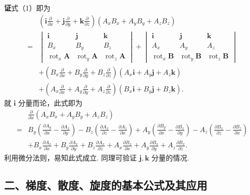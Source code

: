 \documentclass[UTF8, 12pt, fontset=fandol, oneside]{ctexart}
\begin{document}
\noindent\textbf{证}\quad 式（1）即为
\[
\begin{aligned}
&\left(\mathbf i\frac{\partial}{\partial x}+\mathbf j\frac{\partial}{\partial y}+\mathbf k\frac{\partial}{\partial z}\right)
(A_xB_x+A_yB_y+A_zB_z)\\
={}&
\begin{vmatrix}
\mathbf i & \mathbf j & \mathbf k\\
B_x & B_y & B_z\\
\operatorname{rot}_x\mathbf A & \operatorname{rot}_y\mathbf A & \operatorname{rot}_z\mathbf A
\end{vmatrix}
+
\begin{vmatrix}
\mathbf i & \mathbf j & \mathbf k\\
A_x & A_y & A_z\\
\operatorname{rot}_x\mathbf B & \operatorname{rot}_y\mathbf B & \operatorname{rot}_z\mathbf B
\end{vmatrix}\\
&+\left(B_x\frac{\partial}{\partial x}+B_y\frac{\partial}{\partial y}+B_z\frac{\partial}{\partial z}\right)(A_x\mathbf i+A_y\mathbf j+A_z\mathbf k)\\
&+\left(A_x\frac{\partial}{\partial x}+A_y\frac{\partial}{\partial y}+A_z\frac{\partial}{\partial z}\right)(B_x\mathbf i+B_y\mathbf j+B_z\mathbf k).
\end{aligned}
\]
就 $\mathbf i$ 分量而论，此式即为
\[
\begin{aligned}
&\frac{\partial}{\partial x}(A_xB_x+A_yB_y+A_zB_z)\\
={}&B_y\left(\frac{\partial A_y}{\partial x}-\frac{\partial A_x}{\partial y}\right)
-B_z\left(\frac{\partial A_x}{\partial z}-\frac{\partial A_z}{\partial x}\right)
+A_y\left(\frac{\partial B_y}{\partial x}-\frac{\partial B_x}{\partial y}\right)
-A_z\left(\frac{\partial B_x}{\partial z}-\frac{\partial B_z}{\partial x}\right)\\
&+B_x\frac{\partial A_x}{\partial x}
+B_y\frac{\partial A_x}{\partial y}
+B_z\frac{\partial A_x}{\partial z}
+A_x\frac{\partial B_x}{\partial x}
+A_y\frac{\partial B_x}{\partial y}
+A_z\frac{\partial B_x}{\partial z}.
\end{aligned}
\]
利用微分法则，易知此式成立. 同理可验证 $\mathbf j,\mathbf k$ 分量的情况.

\subsection*{二、梯度、散度、旋度的基本公式及其应用}
\end{document}

